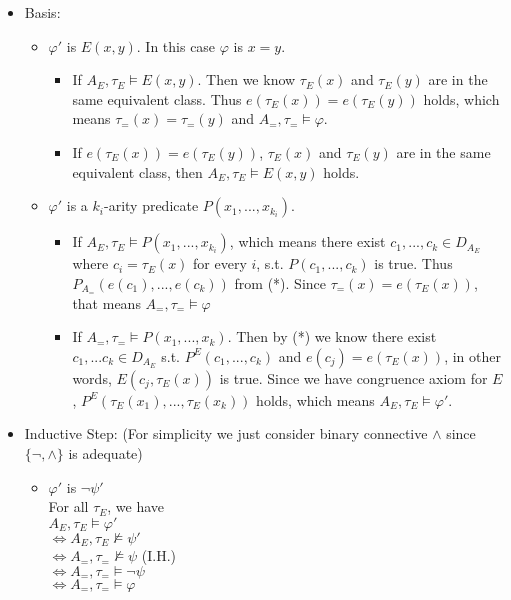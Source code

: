 \documentclass[12pt]{article}
\renewcommand{\phi}{\varphi}
\begin{document}
\begin{enumerate}
\begin{itemize}
		\begin{itemize}
			\item Basis:
			\begin{itemize}
				\item $\phi'$ is $E(x,y)$. In this case $\phi$ is $x=y$. 
				\begin{itemize}
					\item If $A_E,\tau_E\models E(x,y)$. Then we know $\tau_E(x)$ and $\tau_E(y)$ are in the same equivalent class. Thus $e(\tau_E(x))=e(\tau_E(y))$ holds, which means $\tau_=(x)=\tau_=(y)$ and $A_=,\tau_=\models \phi $.
					\item If $e(\tau_E(x))=e(\tau_E(y))$, $\tau_E(x)$ and $\tau_E(y)$ are in the same equivalent class, then $A_E,\tau_E\models E(x,y)$ holds.
				\end{itemize}
				\item $\phi'$ is a $k_i$-arity predicate $P(x_1,...,x_{k_i})$.
				\begin{itemize}
					\item If $A_E,\tau_E\models P(x_1,...,x_{k_i})$, which means there exist $c_1,...,c_k\in D_{A_E}$ where $c_i=\tau_E(x)$ for every $i$, s.t. $P(c_1,...,c_k)$ is true. Thus $P_{A_=}(e(c_1),...,e(c_k))$ from (*). Since $\tau_=(x)=e(\tau_E(x))$, that means $A_=,\tau_=\models \phi$ 
					\item If $A_=,\tau_=\models P(x_1,...,x_k)$. Then by (*) we know there exist $c_1,...c_k \in D_{A_E}$ s.t. $P^E(c_1,...,c_k)$ and $e(c_j)=e(\tau_E(x))$, in other words, $E(c_j,\tau_E(x))$ is true.
					Since we have congruence axiom for $E$, $P^E(\tau_E(x_1),...,\tau_E(x_k))$ holds, which means $A_E,\tau_E\models \phi'$.
				\end{itemize} 
			\end{itemize}
		\item Inductive Step: (For simplicity we just consider binary connective $\wedge$ since $\{\neg,\wedge\}$ is adequate)
		\begin{itemize}
			\item $\phi'$ is $\neg \psi'$\\
				For all $\tau_E$, we have\\
				$A_E,\tau_E\models \phi'$\\
				$\Leftrightarrow A_E,\tau_E\not\models \psi'$\\
				$\Leftrightarrow A_=,\tau_=\not\models \psi$ (I.H.)\\
				$\Leftrightarrow A_=,\tau_=\models \neg\psi$ \\
				$\Leftrightarrow A_=,\tau_=\models \phi$

\end{itemize}
\end{itemize}
\end{itemize}
\end{enumerate}
\end{document}
